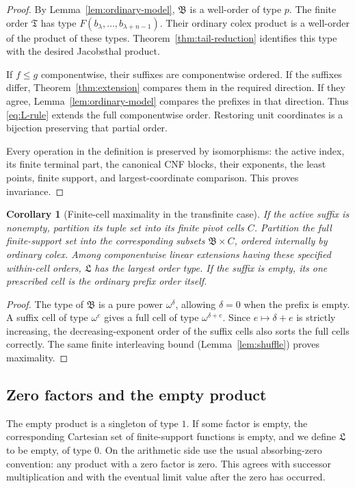 \documentclass[11pt,letterpaper]{article}
\newtheorem{corollary}[theorem]{Corollary}
\theoremstyle{definition}
\theoremstyle{remark}
\newcommand{\LL}{\mathfrak L}
\newcommand{\BB}{\mathfrak B}
\begin{document}
\begin{proof}
By Lemma~\ref{lem:ordinary-model}, $\BB$ is a well-order of type $p$.
The finite order $\mathfrak T$ has type
$F(b_\lambda,\ldots,b_{\lambda+n-1})$. Their ordinary colex product is a
well-order of the product of these types. Theorem~\ref{thm:tail-reduction}
identifies this type with the desired Jacobsthal product.

If $f\leq g$ componentwise, their suffixes are componentwise ordered.
If the suffixes differ, Theorem~\ref{thm:extension} compares them in the
required direction. If they agree, Lemma~\ref{lem:ordinary-model} compares
the prefixes in that direction. Thus \eqref{eq:L-rule} extends the full
componentwise order. Restoring unit coordinates is a bijection preserving
that partial order.

Every operation in the definition is preserved by isomorphisms: the
active index, its finite terminal part, the canonical CNF blocks, their
exponents, the least points, finite support, and largest-coordinate
comparison. This proves invariance.
\end{proof}

\begin{corollary}[Finite-cell maximality in the transfinite case]
If the active suffix is nonempty, partition its tuple set into its finite
pivot cells $C$. Partition the full finite-support set into the
corresponding subsets $\BB\times C$, ordered internally by ordinary
colex. Among componentwise linear extensions having these specified
within-cell orders, $\LL$ has the largest order type. If the suffix is
empty, its one prescribed cell is the ordinary prefix order itself.
\end{corollary}

\begin{proof}
The type of $\BB$ is a pure power $\omega^\delta$, allowing $\delta=0$
when the prefix is empty. A suffix cell of type $\omega^e$ gives a full
cell of type $\omega^{\delta+e}$. Since $e\mapsto\delta+e$ is strictly
increasing, the decreasing-exponent order of the suffix cells also sorts
the full cells correctly. The same finite interleaving bound
(Lemma~\ref{lem:shuffle}) proves maximality.
\end{proof}

\subsection{Zero factors and the empty product}\label{subsec:zero}

The empty product is a singleton of type $1$. If some factor is empty,
the corresponding Cartesian set of finite-support functions is empty,
and we define $\LL$ to be empty, of type $0$. On the arithmetic side use
the usual absorbing-zero convention: any product with a zero factor is
zero. This agrees with successor multiplication and with the eventual
limit value after the zero has occurred.
\end{document}
